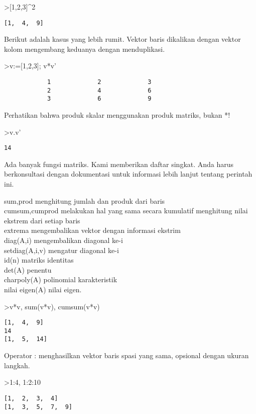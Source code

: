 \documentclass[
]{book}
\begin{document}
\textgreater{[}1,2,3{]}\^{}2

\begin{verbatim}
[1,  4,  9]
\end{verbatim}

Berikut adalah kasus yang lebih rumit. Vektor baris dikalikan dengan vektor kolom mengembang keduanya dengan menduplikasi.

\textgreater v:={[}1,2,3{]}; v*v'

\begin{verbatim}
            1             2             3 
            2             4             6 
            3             6             9 
\end{verbatim}

Perhatikan bahwa produk skalar menggunakan produk matriks, bukan *!

\textgreater v.v'

\begin{verbatim}
14
\end{verbatim}

Ada banyak fungsi matriks. Kami memberikan daftar singkat. Anda harus berkonsultasi dengan dokumentasi untuk informasi lebih lanjut tentang perintah ini.

sum,prod menghitung jumlah dan produk dari baris\\
cumsum,cumprod melakukan hal yang sama secara kumulatif menghitung nilai ekstrem dari setiap baris\\
extrema mengembalikan vektor dengan informasi ekstrim\\
diag(A,i) mengembalikan diagonal ke-i\\
setdiag(A,i,v) mengatur diagonal ke-i\\
id(n) matriks identitas\\
det(A) penentu\\
charpoly(A) polinomial karakteristik\\
nilai eigen(A) nilai eigen.

\textgreater v*v, sum(v*v), cumsum(v*v)

\begin{verbatim}
[1,  4,  9]
14
[1,  5,  14]
\end{verbatim}

Operator : menghasilkan vektor baris spasi yang sama, opsional dengan ukuran langkah.

\textgreater1:4, 1:2:10

\begin{verbatim}
[1,  2,  3,  4]
[1,  3,  5,  7,  9]
\end{verbatim}
\end{document}
